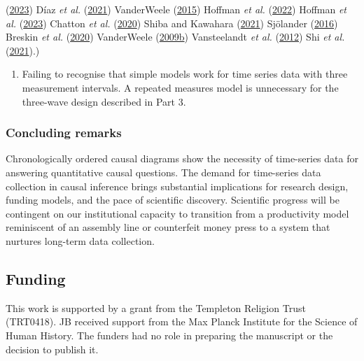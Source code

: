 \documentclass[
  singlecolumn]{article}
\providecommand{\tightlist}{%
  \setlength{\itemsep}{0pt}\setlength{\parskip}{0pt}}\usepackage{longtable,booktabs,array}
\begin{document}
\begin{enumerate}
{    (\protect\hyperlink{ref-hernuxe1n2023}{2023}) Díaz \emph{et al.}
    (\protect\hyperlink{ref-duxedaz2021}{2021}) VanderWeele
    (\protect\hyperlink{ref-vanderweele2015}{2015}) Hoffman \emph{et
    al.} (\protect\hyperlink{ref-hoffman2022}{2022}) Hoffman \emph{et
    al.} (\protect\hyperlink{ref-hoffman2023}{2023}) Chatton \emph{et
    al.} (\protect\hyperlink{ref-chatton2020}{2020}) Shiba and Kawahara
    (\protect\hyperlink{ref-shiba2021}{2021}) Sjölander
    (\protect\hyperlink{ref-sjuxf6lander2016}{2016}) Breskin \emph{et
    al.} (\protect\hyperlink{ref-breskin2020}{2020}) VanderWeele
    (\protect\hyperlink{ref-vanderweele2009a}{2009b}) Vansteelandt
    \emph{et al.} (\protect\hyperlink{ref-vansteelandt2012}{2012}) Shi
    \emph{et al.} (\protect\hyperlink{ref-shi2021}{2021}).)}
\end{enumerate}

\begin{enumerate}
\def\labelenumi{\arabic{enumi}.}
\setcounter{enumi}{11}
\tightlist
\item
  Failing to recognise that simple models work for time series data with
  three measurement intervals. A repeated measures model is unnecessary
  for the three-wave design described in Part 3.
\end{enumerate}

\hypertarget{concluding-remarks}{%
\subsubsection{Concluding remarks}\label{concluding-remarks}}

Chronologically ordered causal diagrams show the necessity of
time-series data for answering quantitative causal questions. The demand
for time-series data collection in causal inference brings substantial
implications for research design, funding models, and the pace of
scientific discovery. Scientific progress will be contingent on our
institutional capacity to transition from a productivity model
reminiscent of an assembly line or counterfeit money press to a system
that nurtures long-term data collection.

\newpage{}

\hypertarget{funding}{%
\subsection{Funding}\label{funding}}

This work is supported by a grant from the Templeton Religion Trust
(TRT0418). JB received support from the Max Planck Institute for the
Science of Human History. The funders had no role in preparing the
manuscript or the decision to publish it.
\end{document}
